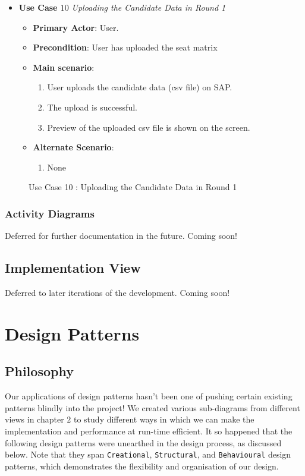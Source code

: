 \documentclass{report}
\begin{document}
\begin{itemize}
    \item \textbf{Use Case $10$} \textit{Uploading the Candidate Data in Round 1
}\\
    \begin{itemize}
        \item \textbf{Primary Actor}: User.
        \item \textbf{Precondition}: User has uploaded the seat matrix
        \item \textbf{Main scenario}: \begin{enumerate}
            \item User uploads the candidate data (csv file) on SAP. 
            \item The upload is successful.
            \item Preview of the uploaded csv file is shown on the screen.
        \end{enumerate}
       \item \textbf{Alternate Scenario}: 
       \begin{enumerate}
           \item 
           None
       \end{enumerate}
    \end{itemize}
\end{itemize}  
\begin{figure}[htp]
\caption{Use Case 10 : Uploading the Candidate Data in Round 1}
\end{figure}

\newpage
\subsection{Activity Diagrams}
Deferred for further documentation in the future. Coming soon!
\section{Implementation View}
Deferred to later iterations of the development. Coming soon!
\chapter{Design Patterns}
\section{Philosophy}
Our applications of design patterns hasn't been one of pushing certain existing patterns blindly into the project! We created various sub-diagrams from different views in chapter $2$ to study different ways in which we can make the implementation and performance at run-time efficient. It so happened that the following design patterns were unearthed in the design process, as discussed below. Note that they span \texttt{Creational}, \texttt{Structural}, and \texttt{Behavioural} design patterns, which demonstrates the flexibility and organisation of our design.
\end{document}
